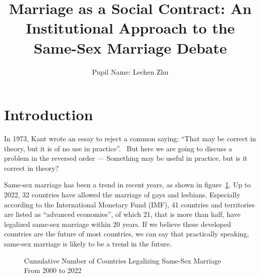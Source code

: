 \documentclass[man,floatsintext]{apa7}
\title{Marriage as a Social Contract: An Institutional Approach to the Same-Sex Marriage Debate}
\author{Pupil Name: Lechen Zhu}
\affiliation{
Centre Number: 94825 \\
Candidate Number: 1008 \\
Unit Number: P301 \\
EPQ June 2024
}
\begin{document}
\maketitle
\tableofcontents

\newpage

\section{Introduction}
In 1973, Kant wrote an essay to reject a common saying: ``That may be correct in theory, but it is of no use in practice''.~\autocite{kantCommonSayingThat2009} But here we are going to discuss a problem in the reversed order --- Something may be useful in practice, but is it correct in theory? 

Same-sex marriage has been a trend in recent years, as shown in figure~\ref{Cumu}. Up to 2022, 32 countries have allowed the marriage of gays and lesbians. Especially according to the International Monetary Fund (IMF), 41 countries and territories are listed as ``advanced economies'', of which 21, that is more than half, have legalized same-sex marriage within 20 years. If we believe these developed countries are the future of most countries, we can say that practically speaking, same-sex marriage is likely to be a trend in the future.


\begin{figure}[H]
    \centering
        
    \caption{Cumulative Number of Countries Legalizing Same-Sex Marriage From 2000 to 2022~\autocite{perper32CountriesWorld2022}}
    \label{Cumu}
\end{figure}
    
\end{document}
